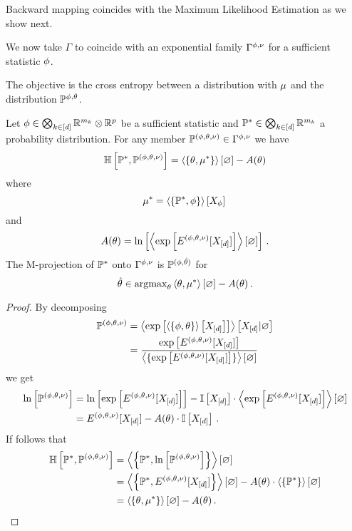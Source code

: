 Backward mapping coincides with the Maximum Likelihood Estimation as we show next.

We now take $\Gamma$ to coincide with an exponential family $\Gamma^{\phi,\nu}$ for a sufficient statistic $\phi$.

The objective is the cross entropy between a distribution with $\mu$ and the distribution $\mathbb{P}^{\phi,\theta}$.

\begin{lemma}
	Let $\phi\in\bigotimes_{k\in[d]} \mathbb{R}^{m_{k}}\otimes\mathbb{R}^{p}$ be a sufficient statistic and $\mathbb{P}^*\in\bigotimes_{k\in[d]} \mathbb{R}^{m_{k}}$ a probability distribution.
	For any member $\mathbb{P}^{(\phi,\theta,\nu)}\in\Gamma^{\phi,\nu}$ we have
		\[ \mathbb{H}\left[\mathbb{P}^*,\mathbb{P}^{(\phi,\theta,\nu)}\right] = \left\langle \left\{\theta,\mu^*\right\}\right\rangle \left[ \varnothing \right] - A(\theta) \]
	where 
		\[ \mu^* = \left\langle \left\{\mathbb{P}^*,\phi\right\}\right\rangle \left[ X_{\phi} \right] \,  \]
	and 
		\[ A(\theta) = \ln \left[ \left\langle \mathrm{exp}\left[E^{(\phi,\theta,\nu)}[X_{[d]}]\right]\right\rangle \left[ \varnothing \right] \right] \, . \]
	The M-projection of $\mathbb{P}^*$ onto $\Gamma^{\phi,\nu}$ is  $\mathbb{P}^{(\phi,\hat{\theta})}$ for
		\[ \hat{\theta}\in \mathrm{argmax}_{\theta}  \left\langle \theta, \mu^*\right\rangle \left[ \varnothing \right] - A(\theta) \, .  \]
\end{lemma}
\begin{proof}
	By decomposing 
	\begin{align*}
		\mathbb{P}^{(\phi,\theta,\nu)} 	& = \left\langle \mathrm{exp}\left[\left\langle \{\phi, \theta\}\right\rangle \left[ X_{[d]} \right]\right]\right\rangle \left[ X_{[d]} | \varnothing \right] \\
				& = \frac{\mathrm{exp}\left[E^{(\phi,\theta,\nu)}[X_{[d]}]\right]}{\left\langle \{\mathrm{exp}\left[E^{(\phi,\theta,\nu)}[X_{[d]}]\right]\}\right\rangle \left[ \varnothing \right]}
	\end{align*}
	we get
	\begin{align*}
		\ln \left[ \mathbb{P}^{(\phi,\theta,\nu)} \right] & = \ln \left[ \mathrm{exp}\left[E^{(\phi,\theta,\nu)}[X_{[d]}]\right] \right] - \mathbb{I}\left[X_{[d]}\right] \cdot \left\langle \mathrm{exp}\left[E^{(\phi,\theta,\nu)}[X_{[d]}]\right]\right\rangle \left[ \varnothing \right] \\ 
		& = E^{(\phi,\theta,\nu)}[X_{[d]}] - A(\theta) \cdot \mathbb{I}\left[X_{[d]}\right]  \, .
	\end{align*}
	If follows that
	\begin{align*}
		\mathbb{H}\left[\mathbb{P}^*,\mathbb{P}^{(\phi,\theta,\nu)}\right] 
		&=  \left\langle \left\{\mathbb{P}^*,\ln \left[ \mathbb{P}^{(\phi,\theta,\nu)} \right]\right\}\right\rangle \left[ \varnothing \right] \\
		&=  \left\langle \left\{\mathbb{P}^*,E^{(\phi,\theta,\nu)}[X_{[d]}]\right\}\right\rangle \left[ \varnothing \right] - A(\theta) \cdot \left\langle \{\mathbb{P}^*\}\right\rangle \left[ \varnothing \right]   \\
		&= \left\langle \left\{\theta, \mu^*\right\}\right\rangle \left[ \varnothing \right] - A(\theta) \, . 
	\end{align*}
\end{proof}




